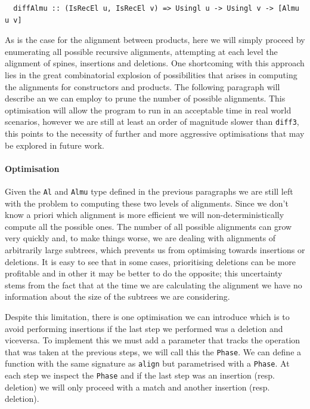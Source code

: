 \documentclass[11pt]{article}
\begin{document}
\begin{lstlisting}
  diffAlmu :: (IsRecEl u, IsRecEl v) => Usingl u -> Usingl v -> [Almu u v]
\end{lstlisting}

As is the case for the alignment between products, here we will simply proceed 
by enumerating all possible recursive alignments, attempting at each level 
the alignment of spines, insertions and deletions.
One shortcoming with this approach lies in the great combinatorial 
explosion of possibilities that arises in computing the alignments for 
constructors and products. The following paragraph will describe an  
we can employ to prune the number of possible alignments. This optimisation 
will allow the program to run in an acceptable time in real world scenarios, however 
we are still at least an order of magnitude slower than \texttt{diff3}, this points to 
the necessity of further and more aggressive optimisations that may be explored 
in future work.

\paragraph{Optimisation}\label{optimisations}

Given the \texttt{Al} and \texttt{Almu} type defined in the previous paragraphs we are still left with the problem
to computing these two levels of alignments. Since we don't know a priori which alignment
is more efficient we will non-deterministically compute all the possible ones. The number of all possible alignments  
can grow very quickly and, to make things worse, we are dealing with alignments of arbitrarily large subtrees, which prevents
us from optimising towards insertions or deletions. It is easy to see
that in some cases, prioritising deletions can be more profitable and in
other it may be better to do the opposite; this uncertainty stems from
the fact that at the time we are calculating the alignment we have no
information about the size of the subtrees we are considering.

Despite this limitation, there is one optimisation we can introduce which is to 
avoid performing insertions if the last step we performed was a deletion and
viceversa.
To implement this we must add a parameter that tracks the operation that
was taken at the previous steps, we will call this the \texttt{Phase}. We
can define a function with the same signature as
\texttt{align} but parametrised with a \texttt{Phase}. At each step we inspect 
the \texttt{Phase} and if the last step was an insertion (resp. deletion) we 
will only proceed with a match and another insertion (resp. deletion). 
\end{document}
